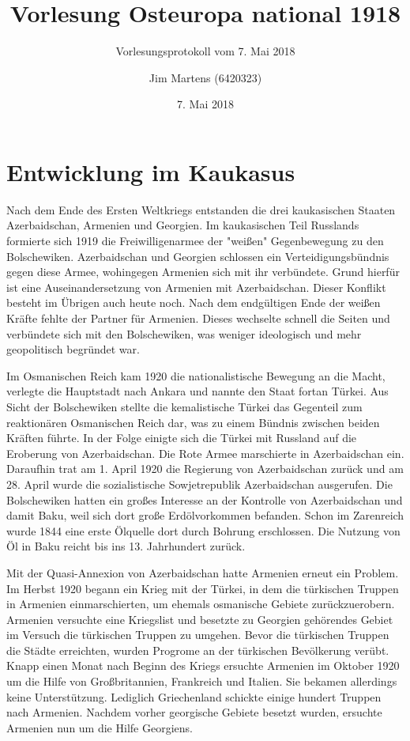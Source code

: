 \documentclass[10pt,a4paper,oneside,ngerman,numbers=noenddot]{scrartcl}
\begin{document}
\author{Jim Martens (6420323)}
\title{Vorlesung Osteuropa national 1918}
\subtitle{Vorlesungsprotokoll vom 7. Mai 2018}
\date{7. Mai 2018}
\maketitle

\section{Entwicklung im Kaukasus}

Nach dem Ende des Ersten Weltkriegs entstanden die drei kaukasischen Staaten
Azerbaidschan, Armenien und Georgien. Im kaukasischen Teil Russlands formierte
sich 1919 die Freiwilligenarmee der "weißen" Gegenbewegung zu den Bolschewiken.
Azerbaidschan und Georgien schlossen ein Verteidigungsbündnis gegen diese
Armee, wohingegen Armenien sich mit ihr verbündete. Grund hierfür ist eine
Auseinandersetzung von Armenien mit Azerbaidschan. Dieser Konflikt besteht
im Übrigen auch heute noch. Nach dem endgültigen Ende der weißen Kräfte fehlte
der Partner für Armenien. Dieses wechselte schnell die Seiten und verbündete sich
mit den Bolschewiken, was weniger ideologisch und mehr geopolitisch begründet
war.

Im Osmanischen Reich kam 1920 die nationalistische Bewegung an die Macht, verlegte
die Hauptstadt nach Ankara und nannte den Staat fortan Türkei. Aus Sicht der
Bolschewiken stellte die kemalistische Türkei das Gegenteil zum reaktionären
Osmanischen Reich dar, was zu einem Bündnis zwischen beiden Kräften führte.
In der Folge einigte sich die Türkei mit Russland auf die Eroberung von Azerbaidschan.
Die Rote Armee marschierte in Azerbaidschan ein. Daraufhin trat am 1. April 1920
die Regierung von Azerbaidschan zurück und am 28. April wurde die sozialistische
Sowjetrepublik Azerbaidschan ausgerufen. Die Bolschewiken hatten ein großes
Interesse an der Kontrolle von Azerbaidschan und damit Baku, weil sich dort
große Erdölvorkommen befanden. Schon im Zarenreich wurde 1844 eine erste
Ölquelle dort durch Bohrung erschlossen. Die Nutzung von Öl in Baku
reicht bis ins 13. Jahrhundert zurück.

Mit der Quasi-Annexion von Azerbaidschan hatte Armenien erneut ein Problem.
Im Herbst 1920 begann ein Krieg mit der Türkei, in dem die türkischen Truppen
in Armenien einmarschierten, um ehemals osmanische Gebiete zurückzuerobern.
Armenien versuchte eine Kriegslist und besetzte zu Georgien gehörendes Gebiet
im Versuch die türkischen Truppen zu umgehen. Bevor die türkischen Truppen
die Städte erreichten, wurden Progrome an der türkischen Bevölkerung verübt.
Knapp einen Monat nach Beginn des Kriegs ersuchte Armenien im Oktober 1920 um die
Hilfe von Großbritannien, Frankreich und Italien. Sie bekamen allerdings keine
Unterstützung. Lediglich Griechenland schickte einige hundert Truppen nach
Armenien. Nachdem vorher georgische Gebiete besetzt wurden, ersuchte Armenien
nun um die Hilfe Georgiens.
\end{document}
